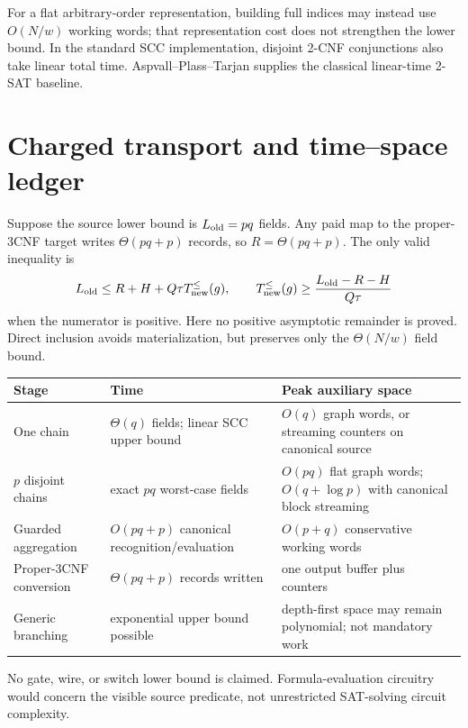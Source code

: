 \documentclass[11pt]{article}
\begin{document}
For a flat arbitrary-order representation, building full indices may instead
use $O(N/w)$ working words; that representation cost does not strengthen the
lower bound.  In the standard SCC implementation, disjoint 2-CNF conjunctions
also take linear total time.  Aspvall--Plass--Tarjan supplies the classical
linear-time 2-SAT baseline.

\section{Charged transport and time--space ledger}
Suppose the source lower bound is $L_{\rm old}=pq$ fields.  Any paid map to the
proper-3CNF target writes $\Theta(pq+p)$ records, so
$R=\Theta(pq+p)$.  The only valid inequality is
\[
L_{\rm old}
\le R+H+Q\tau T_{\rm new}^{\le}(g),
\qquad
T_{\rm new}^{\le}(g)
\ge\frac{L_{\rm old}-R-H}{Q\tau}
\]
when the numerator is positive.  Here no positive asymptotic remainder is
proved.  Direct inclusion avoids materialization, but preserves only the
$\Theta(N/w)$ field bound.

\begin{center}\small
\begin{tabular}{p{.25\linewidth}p{.24\linewidth}p{.36\linewidth}}
\toprule
Stage & Time & Peak auxiliary space\\\midrule
One chain & $\Theta(q)$ fields; linear SCC upper bound & $O(q)$ graph words, or streaming counters on canonical source\\
$p$ disjoint chains & exact $pq$ worst-case fields & $O(pq)$ flat graph words; $O(q+\log p)$ with canonical block streaming\\
Guarded aggregation & $O(pq+p)$ canonical recognition/evaluation & $O(p+q)$ conservative working words\\
Proper-3CNF conversion & $\Theta(pq+p)$ records written & one output buffer plus counters\\
Generic branching & exponential upper bound possible & depth-first space may remain polynomial; not mandatory work\\
\bottomrule
\end{tabular}
\end{center}

No gate, wire, or switch lower bound is claimed.  Formula-evaluation circuitry
would concern the visible source predicate, not unrestricted SAT-solving
circuit complexity.
\end{document}
